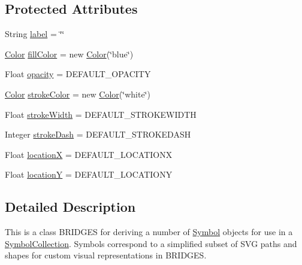 \subsection*{Protected Attributes}
\begin{DoxyCompactItemize}
\item 
String \mbox{\hyperlink{classbridges_1_1base_1_1_symbol_ad2adcc82e6a96c2f3c465702502655e9}{label}} = \char`\"{}\char`\"{}
\item 
\mbox{\hyperlink{classbridges_1_1base_1_1_color}{Color}} \mbox{\hyperlink{classbridges_1_1base_1_1_symbol_a44f00712b6c584c7778ed9de4c394cbf}{fill\+Color}} = new \mbox{\hyperlink{classbridges_1_1base_1_1_color}{Color}}(\char`\"{}blue\char`\"{})
\item 
Float \mbox{\hyperlink{classbridges_1_1base_1_1_symbol_a7a01e5219d556a24e923885fe1646abb}{opacity}} = D\+E\+F\+A\+U\+L\+T\+\_\+\+O\+P\+A\+C\+I\+TY
\item 
\mbox{\hyperlink{classbridges_1_1base_1_1_color}{Color}} \mbox{\hyperlink{classbridges_1_1base_1_1_symbol_a51a9a36983b00156284d86ca80cccfb0}{stroke\+Color}} = new \mbox{\hyperlink{classbridges_1_1base_1_1_color}{Color}}(\char`\"{}white\char`\"{})
\item 
Float \mbox{\hyperlink{classbridges_1_1base_1_1_symbol_a9f90a6efb9cb7a2f4e38c46862ae5a95}{stroke\+Width}} = D\+E\+F\+A\+U\+L\+T\+\_\+\+S\+T\+R\+O\+K\+E\+W\+I\+D\+TH
\item 
Integer \mbox{\hyperlink{classbridges_1_1base_1_1_symbol_a04134e835474c4747e334389f00513c0}{stroke\+Dash}} = D\+E\+F\+A\+U\+L\+T\+\_\+\+S\+T\+R\+O\+K\+E\+D\+A\+SH
\item 
Float \mbox{\hyperlink{classbridges_1_1base_1_1_symbol_af3bf62ef04db518c6de7876bfa5ad5f9}{locationX}} = D\+E\+F\+A\+U\+L\+T\+\_\+\+L\+O\+C\+A\+T\+I\+O\+NX
\item 
Float \mbox{\hyperlink{classbridges_1_1base_1_1_symbol_a130677ce61d8d23f0ffe48c291354d5b}{locationY}} = D\+E\+F\+A\+U\+L\+T\+\_\+\+L\+O\+C\+A\+T\+I\+O\+NY
\end{DoxyCompactItemize}


\subsection{Detailed Description}
This is a class B\+R\+I\+D\+G\+ES for deriving a number of \mbox{\hyperlink{classbridges_1_1base_1_1_symbol}{Symbol}} objects for use in a \mbox{\hyperlink{classbridges_1_1base_1_1_symbol_collection}{Symbol\+Collection}}. Symbols correspond to a simplified subset of S\+VG paths and shapes for custom visual representations in B\+R\+I\+D\+G\+ES. 

